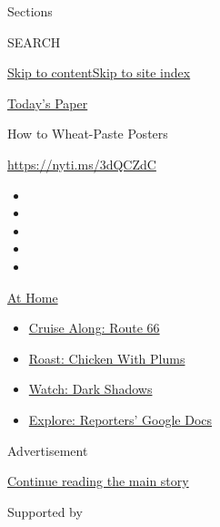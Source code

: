 Sections

SEARCH

\protect\hyperlink{site-content}{Skip to
content}\protect\hyperlink{site-index}{Skip to site index}

\href{https://myaccount.nytimes3xbfgragh.onion/auth/login?response_type=cookie\&client_id=vi}{}

\href{https://www.nytimes3xbfgragh.onion/section/todayspaper}{Today's
Paper}

How to Wheat-Paste Posters

\url{https://nyti.ms/3dQCZdC}

\begin{itemize}
\item
\item
\item
\item
\item
\end{itemize}

\href{https://www.nytimes3xbfgragh.onion/spotlight/at-home?action=click\&pgtype=Article\&state=default\&region=TOP_BANNER\&context=at_home_menu}{At
Home}

\begin{itemize}
\tightlist
\item
  \href{https://www.nytimes3xbfgragh.onion/2020/09/07/travel/route-66.html?action=click\&pgtype=Article\&state=default\&region=TOP_BANNER\&context=at_home_menu}{Cruise
  Along: Route 66}
\item
  \href{https://www.nytimes3xbfgragh.onion/2020/09/04/dining/sheet-pan-chicken.html?action=click\&pgtype=Article\&state=default\&region=TOP_BANNER\&context=at_home_menu}{Roast:
  Chicken With Plums}
\item
  \href{https://www.nytimes3xbfgragh.onion/2020/09/04/arts/television/dark-shadows-stream.html?action=click\&pgtype=Article\&state=default\&region=TOP_BANNER\&context=at_home_menu}{Watch:
  Dark Shadows}
\item
  \href{https://www.nytimes3xbfgragh.onion/interactive/2020/at-home/even-more-reporters-editors-diaries-lists-recommendations.html?action=click\&pgtype=Article\&state=default\&region=TOP_BANNER\&context=at_home_menu}{Explore:
  Reporters' Google Docs}
\end{itemize}

Advertisement

\protect\hyperlink{after-top}{Continue reading the main story}

Supported by

